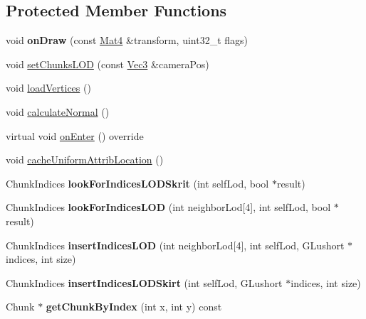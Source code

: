 \subsection*{Protected Member Functions}
\begin{DoxyCompactItemize}
\item 
\mbox{\label{classTerrain_a83eddb26eec75d0698944f2518031280}} 
void {\bfseries on\+Draw} (const \hyperlink{classMat4}{Mat4} \&transform, uint32\+\_\+t flags)
\item 
void \hyperlink{classTerrain_ab2a8b176050b693a801f5a73f1d3b6e0}{set\+Chunks\+L\+OD} (const \hyperlink{classVec3}{Vec3} \&camera\+Pos)
\item 
void \hyperlink{classTerrain_aac8d9ca975f6b0050c49f7cb3c2f37ad}{load\+Vertices} ()
\item 
void \hyperlink{classTerrain_a04237c044acd2918422e7654e18cd89b}{calculate\+Normal} ()
\item 
virtual void \hyperlink{classTerrain_a464acea156d7aca981b7b459708f7d16}{on\+Enter} () override
\item 
void \hyperlink{classTerrain_a33ce1e6fa0fff42e42f510d29553e015}{cache\+Uniform\+Attrib\+Location} ()
\item 
\mbox{\label{classTerrain_ab42f6c37968eb9616cafb778efeca546}} 
Chunk\+Indices {\bfseries look\+For\+Indices\+L\+O\+D\+Skrit} (int self\+Lod, bool $\ast$result)
\item 
\mbox{\label{classTerrain_a36b72386241d5900c6689610ad341fb4}} 
Chunk\+Indices {\bfseries look\+For\+Indices\+L\+OD} (int neighbor\+Lod\mbox{[}4\mbox{]}, int self\+Lod, bool $\ast$result)
\item 
\mbox{\label{classTerrain_a5a76e8050b7b8639bb84561ebe3b50dd}} 
Chunk\+Indices {\bfseries insert\+Indices\+L\+OD} (int neighbor\+Lod\mbox{[}4\mbox{]}, int self\+Lod, G\+Lushort $\ast$indices, int size)
\item 
\mbox{\label{classTerrain_a050032ef0be9842b54f4a02ce44e552d}} 
Chunk\+Indices {\bfseries insert\+Indices\+L\+O\+D\+Skirt} (int self\+Lod, G\+Lushort $\ast$indices, int size)
\item 
\mbox{\label{classTerrain_af56e2c22f82e449f2ca02b748b19b075}} 
Chunk $\ast$ {\bfseries get\+Chunk\+By\+Index} (int x, int y) const

\end{DoxyCompactItemize}

